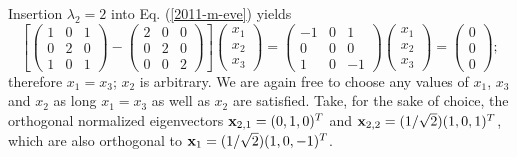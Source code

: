 {Insertion  $\lambda_2=2$ into Eq. (\ref{2011-m-eve}) yields
\begin{equation}
\left[
\left(
\begin{array}{rrrr}
1&0&1\\
0&2&0\\
1&0&1
\end{array}
\right)  -
\left(
\begin{array}{rrrr}
2&0&0\\
0&2&0\\
0&0&2
\end{array}
\right)
\right]
\left(
\begin{array}{rrrr}
x_1\\
x_2\\
x_3
\end{array}
\right)
=
\left(
\begin{array}{rrrr}
-1&0&1\\
0&0&0\\
1&0&-1
\end{array}
\right)
\left(
\begin{array}{rrrr}
x_1\\
x_2\\
x_3
\end{array}
\right)
=
\left(
\begin{array}{rrrr}
0\\
0\\
0
\end{array}
\right)
;
\end{equation}
therefore $x_1=x_3$; $x_2$ is arbitrary.
We are again free to choose any values of $x_1$, $x_3$ and $x_2$ as long
 $x_1=x_3$ as well as $x_2$ are satisfied.
Take, for the sake of choice, the orthogonal
normalized eigenvectors
${\bf x}_{2,1} = (0,1,0)^T$ and
${\bf x}_{2,2} = (1/\sqrt{2})(1,0,1)^T$,
which are also orthogonal to ${\bf x}_1 =(1/\sqrt{2})(1,0,-1)^T$.

}
